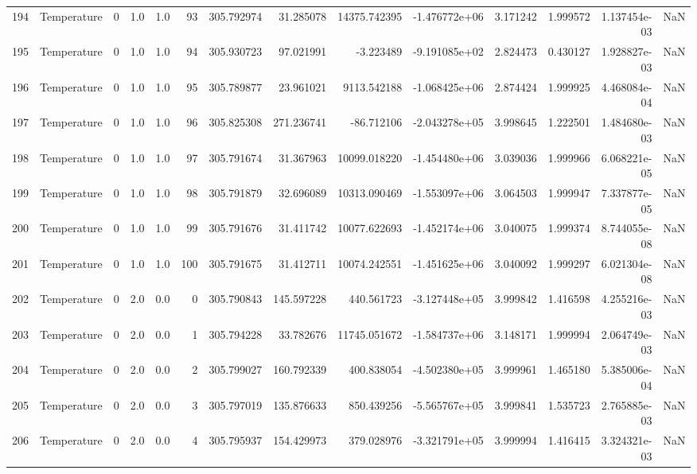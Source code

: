 \begin{tabular}{llrrrrrrrrrrrr}
194 &  Temperature &       0 &  1.0 &  1.0 &   93 &  305.792974 &    31.285078 &   14375.742395 & -1.476772e+06 &  3.171242 &  1.999572 &  1.137454e-03 &      NaN \\
195 &  Temperature &       0 &  1.0 &  1.0 &   94 &  305.930723 &    97.021991 &      -3.223489 & -9.191085e+02 &  2.824473 &  0.430127 &  1.928827e-03 &      NaN \\
196 &  Temperature &       0 &  1.0 &  1.0 &   95 &  305.789877 &    23.961021 &    9113.542188 & -1.068425e+06 &  2.874424 &  1.999925 &  4.468084e-04 &      NaN \\
197 &  Temperature &       0 &  1.0 &  1.0 &   96 &  305.825308 &   271.236741 &     -86.712106 & -2.043278e+05 &  3.998645 &  1.222501 &  1.484680e-03 &      NaN \\
198 &  Temperature &       0 &  1.0 &  1.0 &   97 &  305.791674 &    31.367963 &   10099.018220 & -1.454480e+06 &  3.039036 &  1.999966 &  6.068221e-05 &      NaN \\
199 &  Temperature &       0 &  1.0 &  1.0 &   98 &  305.791879 &    32.696089 &   10313.090469 & -1.553097e+06 &  3.064503 &  1.999947 &  7.337877e-05 &      NaN \\
200 &  Temperature &       0 &  1.0 &  1.0 &   99 &  305.791676 &    31.411742 &   10077.622693 & -1.452174e+06 &  3.040075 &  1.999374 &  8.744055e-08 &      NaN \\
201 &  Temperature &       0 &  1.0 &  1.0 &  100 &  305.791675 &    31.412711 &   10074.242551 & -1.451625e+06 &  3.040092 &  1.999297 &  6.021304e-08 &      NaN \\
202 &  Temperature &       0 &  2.0 &  0.0 &    0 &  305.790843 &   145.597228 &     440.561723 & -3.127448e+05 &  3.999842 &  1.416598 &  4.255216e-03 &      NaN \\
203 &  Temperature &       0 &  2.0 &  0.0 &    1 &  305.794228 &    33.782676 &   11745.051672 & -1.584737e+06 &  3.148171 &  1.999994 &  2.064749e-03 &      NaN \\
204 &  Temperature &       0 &  2.0 &  0.0 &    2 &  305.799027 &   160.792339 &     400.838054 & -4.502380e+05 &  3.999961 &  1.465180 &  5.385006e-04 &      NaN \\
205 &  Temperature &       0 &  2.0 &  0.0 &    3 &  305.797019 &   135.876633 &     850.439256 & -5.565767e+05 &  3.999841 &  1.535723 &  2.765885e-03 &      NaN \\
206 &  Temperature &       0 &  2.0 &  0.0 &    4 &  305.795937 &   154.429973 &     379.028976 & -3.321791e+05 &  3.999994 &  1.416415 &  3.324321e-03 &      NaN \\

\end{tabular}
